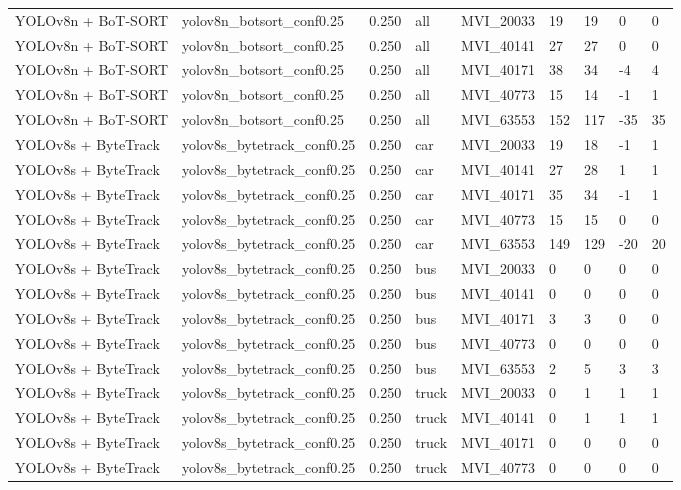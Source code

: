\begin{tabular}{lllllllll}
YOLOv8n + BoT-SORT & yolov8n\_botsort\_conf0.25 & 0.250 & all & MVI\_20033 & 19 & 19 & 0 & 0 \\
YOLOv8n + BoT-SORT & yolov8n\_botsort\_conf0.25 & 0.250 & all & MVI\_40141 & 27 & 27 & 0 & 0 \\
YOLOv8n + BoT-SORT & yolov8n\_botsort\_conf0.25 & 0.250 & all & MVI\_40171 & 38 & 34 & -4 & 4 \\
YOLOv8n + BoT-SORT & yolov8n\_botsort\_conf0.25 & 0.250 & all & MVI\_40773 & 15 & 14 & -1 & 1 \\
YOLOv8n + BoT-SORT & yolov8n\_botsort\_conf0.25 & 0.250 & all & MVI\_63553 & 152 & 117 & -35 & 35 \\
YOLOv8s + ByteTrack & yolov8s\_bytetrack\_conf0.25 & 0.250 & car & MVI\_20033 & 19 & 18 & -1 & 1 \\
YOLOv8s + ByteTrack & yolov8s\_bytetrack\_conf0.25 & 0.250 & car & MVI\_40141 & 27 & 28 & 1 & 1 \\
YOLOv8s + ByteTrack & yolov8s\_bytetrack\_conf0.25 & 0.250 & car & MVI\_40171 & 35 & 34 & -1 & 1 \\
YOLOv8s + ByteTrack & yolov8s\_bytetrack\_conf0.25 & 0.250 & car & MVI\_40773 & 15 & 15 & 0 & 0 \\
YOLOv8s + ByteTrack & yolov8s\_bytetrack\_conf0.25 & 0.250 & car & MVI\_63553 & 149 & 129 & -20 & 20 \\
YOLOv8s + ByteTrack & yolov8s\_bytetrack\_conf0.25 & 0.250 & bus & MVI\_20033 & 0 & 0 & 0 & 0 \\
YOLOv8s + ByteTrack & yolov8s\_bytetrack\_conf0.25 & 0.250 & bus & MVI\_40141 & 0 & 0 & 0 & 0 \\
YOLOv8s + ByteTrack & yolov8s\_bytetrack\_conf0.25 & 0.250 & bus & MVI\_40171 & 3 & 3 & 0 & 0 \\
YOLOv8s + ByteTrack & yolov8s\_bytetrack\_conf0.25 & 0.250 & bus & MVI\_40773 & 0 & 0 & 0 & 0 \\
YOLOv8s + ByteTrack & yolov8s\_bytetrack\_conf0.25 & 0.250 & bus & MVI\_63553 & 2 & 5 & 3 & 3 \\
YOLOv8s + ByteTrack & yolov8s\_bytetrack\_conf0.25 & 0.250 & truck & MVI\_20033 & 0 & 1 & 1 & 1 \\
YOLOv8s + ByteTrack & yolov8s\_bytetrack\_conf0.25 & 0.250 & truck & MVI\_40141 & 0 & 1 & 1 & 1 \\
YOLOv8s + ByteTrack & yolov8s\_bytetrack\_conf0.25 & 0.250 & truck & MVI\_40171 & 0 & 0 & 0 & 0 \\
YOLOv8s + ByteTrack & yolov8s\_bytetrack\_conf0.25 & 0.250 & truck & MVI\_40773 & 0 & 0 & 0 & 0 \\

\end{tabular}
